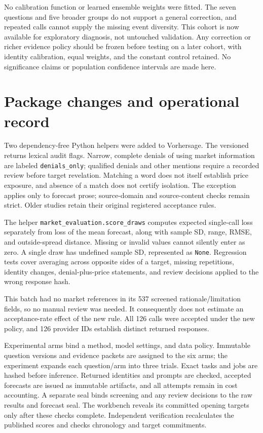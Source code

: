 \documentclass[11pt]{article}
\begin{document}
No calibration function or learned ensemble weights were fitted. The seven
questions and five broader groups do not support a general correction, and
repeated calls cannot supply the missing event diversity. This cohort is now
available for exploratory diagnosis, not untouched validation. Any correction
or richer evidence policy should be frozen before testing on a later cohort,
with identity calibration, equal weights, and the constant control retained.
No significance claims or population confidence intervals are made here.

\appendix
\section{Package changes and operational record}
Two dependency-free Python helpers were added to Vorhersage. The versioned
 returns lexical audit flags.
Narrow, complete denials of using market information are labeled
\texttt{denials\_only}; qualified denials and other mentions require a recorded
review before target revelation. Matching a word does not itself establish
price exposure, and absence of a match does not certify isolation. The exception
applies only to forecast prose; source-domain and source-content checks remain
strict. Older studies retain their original registered acceptance rules.

The helper \texttt{market\_evaluation.score\_draws} computes expected
single-call loss separately from loss of the mean forecast, along with sample
SD, range, RMSE, and outside-spread distance. Missing or invalid values cannot
silently enter as zero. A single draw has undefined sample SD, represented as
\texttt{None}. Regression tests cover averaging across opposite sides of a
target, missing repetitions, identity changes, denial-plus-price statements,
and review decisions applied to the wrong response hash.

This batch had no market references in its 537 screened rationale/limitation
fields, so no manual review was needed. It consequently does not estimate an
acceptance-rate effect of the new rule. All 126 calls were accepted under the
new policy, and 126 provider IDs establish distinct returned responses.

Experimental arms bind a method, model settings, and data policy. Immutable
question versions and evidence packets are assigned to the six arms; the
experiment expands each question/arm into three trials. Exact tasks and jobs
are hashed before inference. Returned identities and prompts are checked,
accepted forecasts are issued as immutable artifacts, and all attempts remain
in cost accounting. A separate seal binds screening and any review decisions
to the raw results and forecast seal. The workbench reveals its committed
opening targets only after these checks complete. Independent verification
recalculates the published scores and checks chronology and target commitments.
\end{document}
